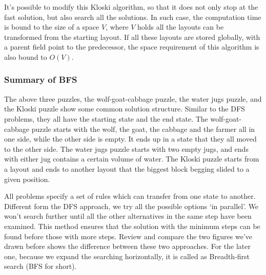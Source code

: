 \documentclass[UTF8]{article}
\begin{document}
It's possible to modify this Kloski algorithm, so that it does not only stop at the
fast solution, but also search all the solutions. In such case, the computation time
is bound to the size of a space $V$, where $V$ holds all the layouts can be transformed
from the starting layout. If all these layouts are stored globally, with a parent field
point to the predecessor, the space requirement of this algorithm is also bound to $O(V)$.

\subsubsection{Summary of BFS}
 
The above three puzzles, the wolf-goat-cabbage puzzle, the water jugs puzzle, and the
Kloski puzzle show some common solution structure. Similar to the DFS problems, they
all have the starting state and the end state.
The wolf-goat-cabbage puzzle starts with the wolf, the goat,
the cabbage and the farmer all in one side, while the other side is empty. It ends up
in a state that they all moved to the other side.  The water jugs
puzzle starts with two empty jugs, and ends with either jug contains a certain volume
of water. The Kloski puzzle starts from a layout and ends to another layout that
the biggest block begging slided to a given position.

All problems specify a set of rules which can transfer from one state to another.
Different form the DFS approach, we try all the possible options `in parallel'. We won't
search further until all the other alternatives in the same step have been examined.
This method ensures that the solution with the minimum steps can be found before those
with more steps. Review and compare the two figures we've drawn before shows the difference
between these two approaches. For the later one, because we expand the searching horizontally,
it is called as Breadth-first search (BFS for short).
\end{document}
